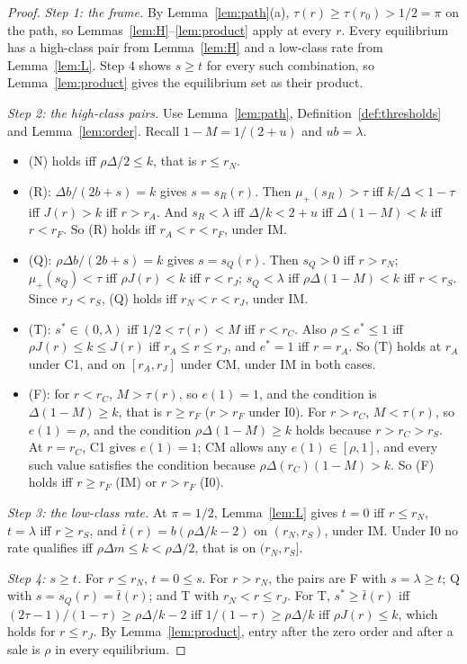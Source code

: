 \documentclass[11pt]{article}
\theoremstyle{definition}
\begin{document}
\begin{proof}
\emph{Step 1: the frame.} By Lemma~\ref{lem:path}(a), $\tau(r)\ge\tau(r_0)>1/2=\pi$ on the path, so
Lemmas~\ref{lem:H}--\ref{lem:product} apply at every $r$. Every equilibrium has a high-class pair from
Lemma~\ref{lem:H} and a low-class rate from Lemma~\ref{lem:L}. Step 4 shows $s\ge t$ for every such combination,
so Lemma~\ref{lem:product} gives the equilibrium set as their product.

\emph{Step 2: the high-class pairs.} Use Lemma~\ref{lem:path}, Definition~\ref{def:thresholds} and
Lemma~\ref{lem:order}. Recall $1-M=1/(2+u)$ and $ub=\lambda$.
\begin{itemize}
\item (N) holds iff $\rho\Delta/2\le k$, that is $r\le r_N$.
\item (R): $\Delta b/(2b+s)=k$ gives $s=s_R(r)$. Then $\mu_+(s_R)>\tau$ iff $k/\Delta<1-\tau$ iff $J(r)>k$ iff
  $r>r_A$. And $s_R<\lambda$ iff $\Delta/k<2+u$ iff $\Delta(1-M)<k$ iff $r<r_F$. So (R) holds iff $r_A<r<r_F$,
  under IM.
\item (Q): $\rho\Delta b/(2b+s)=k$ gives $s=s_Q(r)$. Then $s_Q>0$ iff $r>r_N$; $\mu_+(s_Q)<\tau$ iff $\rho J(r)<k$
  iff $r<r_J$; $s_Q<\lambda$ iff $\rho\Delta(1-M)<k$ iff $r<r_S$. Since $r_J<r_S$, (Q) holds iff $r_N<r<r_J$,
  under IM.
\item (T): $s^*\in(0,\lambda)$ iff $1/2<\tau(r)<M$ iff $r<r_C$. Also $\rho\le e^*\le1$ iff $\rho J(r)\le k\le J(r)$
  iff $r_A\le r\le r_J$, and $e^*=1$ iff $r=r_A$. So (T) holds at $r_A$ under C1, and on $[r_A,r_J]$ under CM,
  under IM in both cases.
\item (F): for $r<r_C$, $M>\tau(r)$, so $e(1)=1$, and the condition is $\Delta(1-M)\ge k$, that is $r\ge r_F$
  ($r>r_F$ under I0). For $r>r_C$, $M<\tau(r)$, so $e(1)=\rho$, and the condition $\rho\Delta(1-M)\ge k$ holds
  because $r>r_C>r_S$. At $r=r_C$, C1 gives $e(1)=1$; CM allows any $e(1)\in[\rho,1]$, and every such value
  satisfies the condition because $\rho\Delta(r_C)(1-M)>k$. So (F) holds iff $r\ge r_F$ (IM) or $r>r_F$ (I0).
\end{itemize}

\emph{Step 3: the low-class rate.} At $\pi=1/2$, Lemma~\ref{lem:L} gives $t=0$ iff $r\le r_N$, $t=\lambda$ iff
$r\ge r_S$, and $\bar t(r)=b(\rho\Delta/k-2)$ on $(r_N,r_S)$, under IM. Under I0 no rate qualifies iff
$\rho\Delta m\le k<\rho\Delta/2$, that is on $(r_N,r_S]$.

\emph{Step 4: $s\ge t$.} For $r\le r_N$, $t=0\le s$. For $r>r_N$, the pairs are F with $s=\lambda\ge t$; Q with
$s=s_Q(r)=\bar t(r)$; and T with $r_N<r\le r_J$. For T, $s^*\ge \bar t(r)$ iff $(2\tau-1)/(1-\tau)\ge\rho\Delta/k-2$ iff
$1/(1-\tau)\ge\rho\Delta/k$ iff $\rho J(r)\le k$, which holds for $r\le r_J$. By Lemma~\ref{lem:product}, entry
after the zero order and after a sale is $\rho$ in every equilibrium.


\end{proof}
\end{document}
